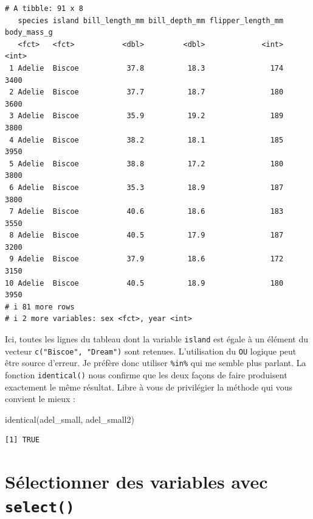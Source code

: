 \documentclass[
  a4paper,
  DIV=11,
  numbers=noendperiod,
  oneside]{scrreprt}
\newenvironment{Shaded}{}{}
\newcommand{\FunctionTok}[1]{\textcolor[rgb]{0.44,0.26,0.76}{#1}}
\newcommand{\NormalTok}[1]{\textcolor[rgb]{0.14,0.16,0.18}{#1}}
\begin{document}
\begin{verbatim}
# A tibble: 91 x 8
   species island bill_length_mm bill_depth_mm flipper_length_mm body_mass_g
   <fct>   <fct>           <dbl>         <dbl>             <int>       <int>
 1 Adelie  Biscoe           37.8          18.3               174        3400
 2 Adelie  Biscoe           37.7          18.7               180        3600
 3 Adelie  Biscoe           35.9          19.2               189        3800
 4 Adelie  Biscoe           38.2          18.1               185        3950
 5 Adelie  Biscoe           38.8          17.2               180        3800
 6 Adelie  Biscoe           35.3          18.9               187        3800
 7 Adelie  Biscoe           40.6          18.6               183        3550
 8 Adelie  Biscoe           40.5          17.9               187        3200
 9 Adelie  Biscoe           37.9          18.6               172        3150
10 Adelie  Biscoe           40.5          18.9               180        3950
# i 81 more rows
# i 2 more variables: sex <fct>, year <int>
\end{verbatim}

Ici, toutes les lignes du tableau dont la variable \texttt{island} est
égale à un élément du vecteur \texttt{c("Biscoe",\ "Dream")} sont
retenues. L'utilisation du \texttt{OU} logique peut être source
d'erreur. Je préfère donc utiliser \texttt{\%in\%} qui me semble plus
parlant. La fonction \texttt{identical()} nous confirme que les deux
façons de faire produisent exactement le même résultat. Libre à vous de
privilégier la méthode qui vous convient le mieux :

\begin{Shaded}
\begin{Highlighting}[]
\FunctionTok{identical}\NormalTok{(adel\_small, adel\_small2)}
\end{Highlighting}
\end{Shaded}

\begin{verbatim}
[1] TRUE
\end{verbatim}

\section{\texorpdfstring{Sélectionner des variables avec
\texttt{select()}}{Sélectionner des variables avec select()}}\label{suxe9lectionner-des-variables-avec-select}
\end{document}
